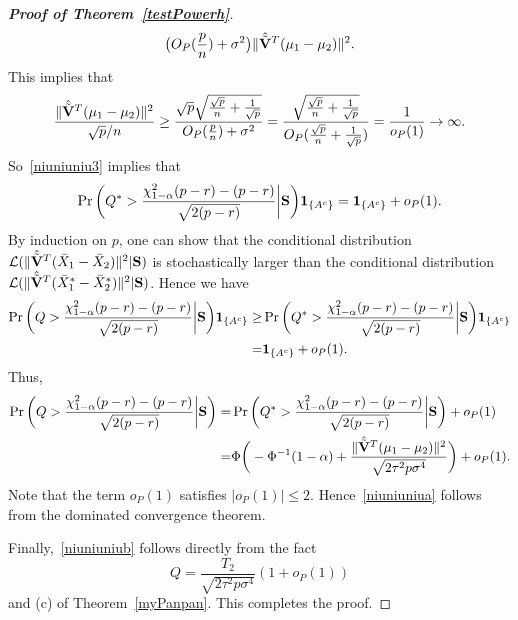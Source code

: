 \documentclass[3p]{elsarticle}
\theoremstyle{plain}
\theoremstyle{definition}
\theoremstyle{remark}
\begin{document}
\begin{appendices}
\begin{proof}[\textbf{Proof of Theorem~\ref{testPowerh}}]
$$\begin{aligned}
           \big(O_P(\frac{p}{n})+\sigma^2\big) \|\hat{\tilde{\mathbf{V}}}^T(\mu_1-\mu_2)\|^2.
    \end{aligned}
$$
This implies that
$$
           \frac{\|\hat{\tilde{\mathbf{V}}}^T(\mu_1-\mu_2)\|^2}{\sqrt{p}/n}\geq 
           \frac{
            \sqrt{p}\sqrt{\frac{\sqrt{p}}{n}+\frac{1}{\sqrt{p}}}
           }{
           O_P(\frac{p}{n})+\sigma^2
           }
           =
           \frac{
           \sqrt{\frac{\sqrt{p}}{n}+\frac{1}{\sqrt{p}}}
           }{
               O_P(\frac{\sqrt{p}}{n}+\frac{1}{\sqrt{p}})
           }
           =\frac{1}{o_P(1)}\to \infty.
$$
So~\eqref{niuniuniu3} implies that 
$$
    \begin{aligned}
        \Pr\bigg(Q^*>\frac{\chi^2_{1-\alpha}(p-r)-(p-r)}{\sqrt{2(p-r)}}\bigg|\mathbf{S}\bigg)\mathbf{1}_{\{A^c\}}= \mathbf{1}_{\{A^c\}}+o_P(1).
    \end{aligned}
$$
    By induction on $p$, one can show that the conditional distribution $\mathcal{L}(\|\hat{\tilde{\mathbf{V}}}^T (\bar{X}_1-\bar{X}_2)\|^2|\mathbf{S})$ is stochastically larger than the conditional distribution $\mathcal{L}(\|\hat{\tilde{\mathbf{V}}}^T (\bar{X}_1^*-\bar{X}_2^*)\|^2|\mathbf{S})$.
    Hence we have
    \begin{equation*}
    \begin{aligned}
        \Pr\bigg(Q>\frac{\chi^2_{1-\alpha}(p-r)-(p-r)}{\sqrt{2(p-r)}}\bigg|\mathbf{S}\bigg)\mathbf{1}_{\{A^c\}}
        \geq &
        \Pr\bigg(Q^*>\frac{\chi^2_{1-\alpha}(p-r)-(p-r)}{\sqrt{2(p-r)}}\bigg|\mathbf{S}\bigg)
\mathbf{1}_{\{A^c\}}
\\
        =&\mathbf{1}_{\{A^c\}}+o_P(1)
        .
    \end{aligned}
    \end{equation*}
    Thus,
$$
    \begin{aligned}
        \Pr\bigg(Q>\frac{\chi^2_{1-\alpha}(p-r)-(p-r)}{\sqrt{2(p-r)}}\bigg|\mathbf{S}\bigg)
        =&
        \Pr\bigg(Q^*>\frac{\chi^2_{1-\alpha}(p-r)-(p-r)}{\sqrt{2(p-r)}}\bigg|\mathbf{S}\bigg)+o_P(1)\\
        =&
        \Phi\bigg(-\Phi^{-1}(1-\alpha)+\frac{\|\hat{\tilde{\mathbf{V}}}^T(\mu_1-\mu_2)\|^2}{\sqrt{2\tau^2 p\sigma^4}}\bigg)+o_P(1).
    \end{aligned}
$$
Note that the term $o_P(1)$ satisfies $|o_P(1)|\leq 2$. Hence~\eqref{niuniuniua} follows from the dominated convergence theorem.

Finally,~\eqref{niuniuniub} follows directly from the fact
$$
    Q=\frac{T_2}{\sqrt{2\tau^2 p\sigma^4}}(1+o_P(1))
$$
and (c) of Theorem~\ref{myPanpan}. This completes the proof.




\end{proof}




\end{appendices}
\end{document}
